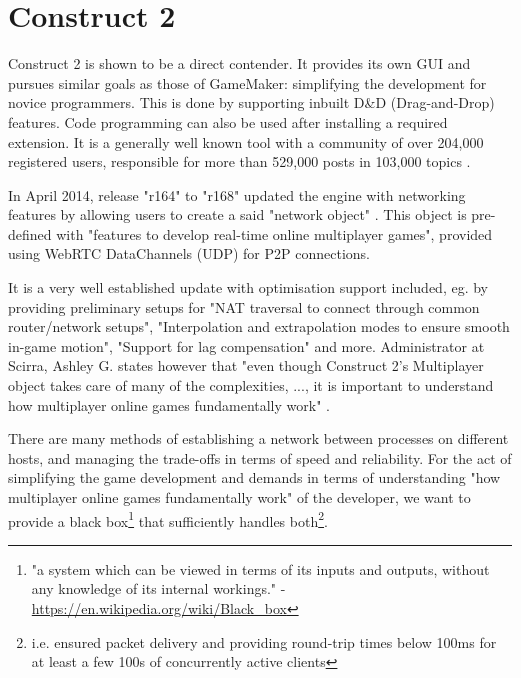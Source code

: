 \documentclass[bsc, 12pt, twoside, singlespacing, parskip, abbrevs, notimes, normalheadings, logo]{styles/infthesis}
\begin{document}
\section{Construct 2}
Construct 2 is shown to be a direct contender. It provides its own GUI and pursues similar goals as those of GameMaker: simplifying the development for novice programmers. This is done by supporting inbuilt D\&D (Drag-and-Drop) features. Code programming can also be used after installing a required extension. It is a generally well known tool with a community of over 204,000 registered users, responsible for more than 529,000 posts in 103,000 topics \cite{scirra_forum}.

\vspace{1em}
In April 2014, release "r164" to "r168" updated the engine with networking features by allowing users to create a said "network object" \cite{construct2_multiplayer}. This object is pre-defined with "features to develop real-time online multiplayer games", provided using WebRTC DataChannels (UDP) for P2P connections. 

\vspace{1em}
It is a very well established update with optimisation support included, eg. by providing preliminary setups for "NAT traversal to connect through common router/network setups", "Interpolation and extrapolation modes to ensure smooth in-game motion", "Support for lag compensation" and more. Administrator at Scirra, Ashley G. states however that "even though Construct 2's Multiplayer object takes care of many of the complexities, ..., it is important to understand how multiplayer online games fundamentally work" \cite{Construct2_Multiplayer_Tutorial}. 

\vspace{1em}
There are many methods of establishing a network between processes on different hosts, and managing the trade-offs in terms of speed and reliability. For the act of simplifying the game development and demands in terms of understanding "how multiplayer online games fundamentally work" of the developer, we want to provide a black box\footnote{"a system which can be viewed in terms of its inputs and outputs, without any knowledge of its internal workings." - \url{https://en.wikipedia.org/wiki/Black\_box}} that sufficiently handles both\footnote{i.e. ensured packet delivery and providing round-trip times below 100ms for at least a few 100s of concurrently active clients}.

\end{document}
